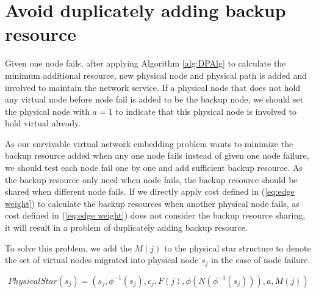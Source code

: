 
\section{Avoid  duplicately adding backup resource}


Given one node fails, after applying Algorithm \ref{alg:DPAlg} to calculate the minimum additional resource, new physical node and physical path is added and involved to maintain the network service. If a physical node that does not hold any virtual node before node fail is added to be the backup node, we should set the physical node with $a=1$ to indicate that this physical node is involved to hold virtual already.

As our survivable virtual network embedding problem wants to minimize the backup resource added when any one node fails instead of given one node failure, we should test each node fail one by one and add sufficient backup resource. As the backup resource only need when node fails,  the  backup resource  should be shared when different node fails. If we directly apply cost defined in (\ref{eq:edge weight}) to calculate the backup resources when another physical node fails, as cost defined in (\ref{eq:edge weight}) does not consider the backup resource sharing, it will result in a problem of duplicately adding backup resource.

To  solve this problem,  we add the  $M(j)$ to the physical star structure to denote the set of virtual nodes migrated into  physical node $s_j$ in the case of node failure.


\begin{equation}
PhysicalStar(s_j)=(s_j, \phi^{-1}( s_j), c_j, F(j), \phi(N(\phi^{-1}( s_j))), a, M(j))
\end{equation}

